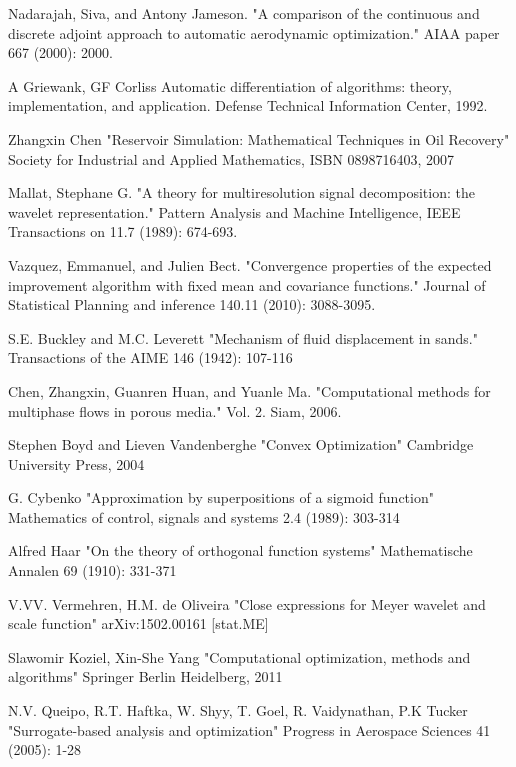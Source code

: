\documentclass[a4paper,onecolumn]{article}
\theoremstyle{remark}
\begin{document}
\begin{thebibliography}{9}
Nadarajah, Siva, and Antony Jameson. 
"A comparison of the continuous and discrete adjoint approach to automatic aerodynamic optimization." 
AIAA paper 667 (2000): 2000.

A Griewank, GF Corliss
Automatic differentiation of algorithms: theory, implementation, and application.
Defense Technical Information Center, 1992.

Zhangxin Chen
"Reservoir Simulation: Mathematical Techniques in Oil Recovery"
Society for Industrial and Applied Mathematics, ISBN 0898716403, 2007

Mallat, Stephane G. 
"A theory for multiresolution signal decomposition: the wavelet representation." 
Pattern Analysis and Machine Intelligence, IEEE Transactions on 11.7 (1989): 674-693.

Vazquez, Emmanuel, and Julien Bect. 
"Convergence properties of the expected improvement algorithm with fixed mean and covariance functions." 
Journal of Statistical Planning and inference 140.11 (2010): 3088-3095.

S.E. Buckley and M.C. Leverett
"Mechanism of fluid displacement in sands."
Transactions of the AIME 146 (1942): 107-116

Chen, Zhangxin, Guanren Huan, and Yuanle Ma. 
"Computational methods for multiphase flows in porous media."
Vol. 2. Siam, 2006.

Stephen Boyd and Lieven Vandenberghe
"Convex Optimization"
Cambridge University Press, 2004

G. Cybenko
"Approximation by superpositions of a sigmoid function"
Mathematics of control, signals and systems 2.4 (1989): 303-314

Alfred Haar
"On the theory of orthogonal function systems"
Mathematische Annalen 69 (1910): 331-371

V.VV. Vermehren, H.M. de Oliveira
"Close expressions for Meyer wavelet and scale function"
arXiv:1502.00161 [stat.ME]

Slawomir Koziel, Xin-She Yang
"Computational optimization, methods and algorithms"
Springer Berlin Heidelberg, 2011

N.V. Queipo, R.T. Haftka, W. Shyy, T. Goel, R. Vaidynathan, P.K Tucker
"Surrogate-based analysis and optimization"
Progress in Aerospace Sciences 41 (2005): 1-28


\end{thebibliography}
\end{document}
